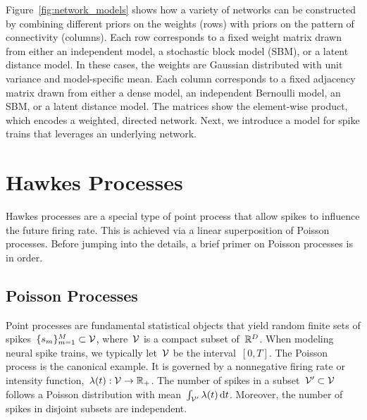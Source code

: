 Figure~\ref{fig:network_models} shows how a variety of networks can be
constructed by combining different priors on the weights (rows) with
priors on the pattern of connectivity (columns). Each row corresponds
to a fixed weight matrix drawn from either an independent model, a
stochastic block model (SBM), or a latent distance model. In these
cases, the weights are Gaussian distributed with unit variance and
model-specific mean. Each column corresponds to a fixed adjacency
matrix drawn from either a dense model, an independent
Bernoulli model, an SBM, or a latent distance model. The matrices show
the element-wise product, which encodes a weighted, directed
network. Next, we introduce a model for spike trains that leverages
an underlying network.


\section{Hawkes Processes}
\label{sec:hawkes_processes}
Hawkes processes \citep{Hawkes-1971} are a special type of point process
that allow spikes to influence the future firing rate. This is achieved
via a linear superposition of Poisson processes. Before jumping into the
details, a brief primer on Poisson processes is in order.

\subsection{Poisson Processes}
\sloppy Point processes are fundamental statistical objects that yield
random finite sets of spikes~${\{s_m\}_{m=1}^M \subset \mathcal{V}}$,
where~$\mathcal{V}$ is a compact subset of~${\mathbb{R}^D}$.  When modeling
neural spike trains, we typically let~${\mathcal{V}}$ be the
interval~${[0,T]}$. The Poisson process is the canonical example. It
is governed by a nonnegative firing rate or intensity
function,~${\lambda(t): \mathcal{V} \rightarrow\mathbb{R}_+}$. The number of
spikes in a subset~${\mathcal{V}'\subset\mathcal{V}}$ follows a Poisson distribution
with mean~${\int_{\mathcal{V}'}\lambda(t) \, \mathrm{d}t}$. Moreover, the number
of spikes in disjoint subsets are independent.

